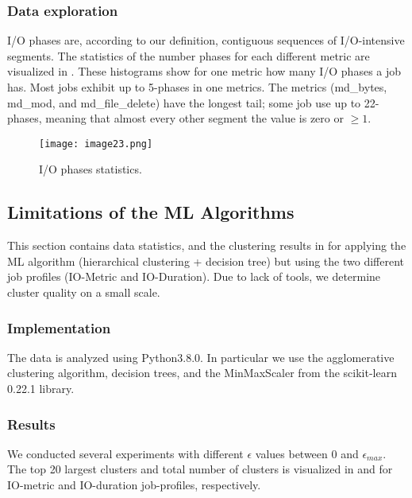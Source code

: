\documentclass{jhps}
\begin{document}
\subsubsection{Data exploration}
I/O phases are, according to our definition, contiguous sequences of I/O-intensive segments.
The statistics of the number phases for each different metric are visualized in .
These histograms show for one metric how many I/O phases a job has.
Most jobs exhibit up to 5-phases in one metrics.
The metrics (md\_bytes, md\_mod, and md\_file\_delete) have the longest tail; some job use up to 22-phases, meaning that almost every other segment the value is zero or $\geq 1$.



\begin{figure}
  \centering
  \texttt{[image: image23.png]}
  \caption{I/O phases statistics.}
  \label{fig:phases_stats}
\end{figure}


\subsection{Limitations of the ML Algorithms}
This section contains data statistics, and the clustering results in  for applying the ML algorithm (hierarchical clustering + decision tree) but using the two different job profiles (IO-Metric and IO-Duration).
Due to lack of tools, we determine cluster quality on a small scale.

\subsubsection{Implementation}
The data is analyzed using Python3.8.0.
In particular we use the agglomerative clustering algorithm, decision trees, and the MinMaxScaler from the scikit-learn 0.22.1 library.


\subsubsection{Results}
We conducted several experiments with different $\epsilon$ values between 0 and $\epsilon_{max}$.
The top 20 largest clusters and total number of clusters is visualized in  and  for IO-metric and IO-duration job-profiles, respectively.
\end{document}
